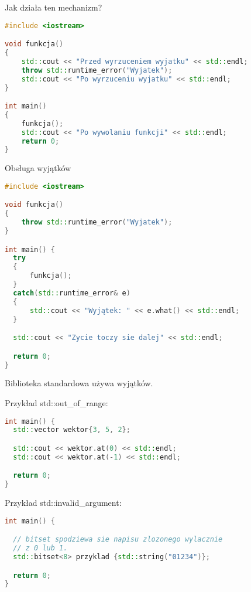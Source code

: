 \documentclass[notheorems, aspectratio=54]{beamer}
\begin{document}
\begin{frame}
Jak działa ten mechanizm?

\begin{lstlisting}[language=C++]
#include <iostream>

void funkcja()
{
    std::cout << "Przed wyrzuceniem wyjatku" << std::endl;
    throw std::runtime_error("Wyjatek");
    std::cout << "Po wyrzuceniu wyjatku" << std::endl;
}

int main()
{
    funkcja();
    std::cout << "Po wywolaniu funkcji" << std::endl;
    return 0;
}
\end{lstlisting}
\end{frame}

\begin{frame}
Obsługa wyjątków

\begin{lstlisting}[language=C++]
#include <iostream>

void funkcja()
{
    throw std::runtime_error("Wyjatek");
}

int main() {
  try
  {
      funkcja();
  }
  catch(std::runtime_error& e)
  {
      std::cout << "Wyjątek: " << e.what() << std::endl;
  }

  std::cout << "Zycie toczy sie dalej" << std::endl;

  return 0;
}
\end{lstlisting}
\end{frame}

\begin{frame}
Biblioteka standardowa używa wyjątków.

Przykład std::out_of_range:
\begin{lstlisting}[language=C++]
int main() {
  std::vector wektor{3, 5, 2};

  std::cout << wektor.at(0) << std::endl;
  std::cout << wektor.at(-1) << std::endl;

  return 0;
}
\end{lstlisting}

Przykład std::invalid_argument:
\begin{lstlisting}[language=C++]
int main() {

  // bitset spodziewa sie napisu zlozonego wylacznie
  // z 0 lub 1.
  std::bitset<8> przyklad {std::string("01234")};

  return 0;
}
\end{lstlisting}

\end{frame}
\end{document}
